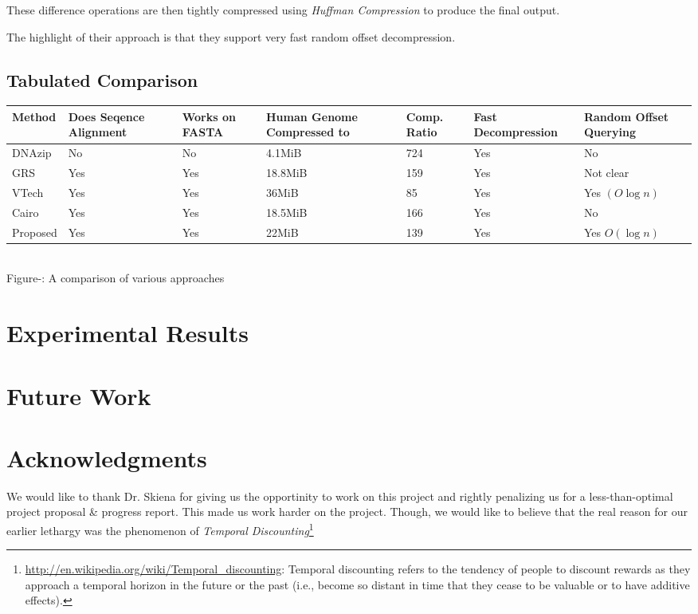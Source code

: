\documentclass[11pt]{article}
\newcounter{fignum}
\begin{document}
These difference operations are then tightly compressed using
\textit{Huffman Compression} to produce the final output.

The highlight of their approach is that they support very fast random
offset decompression.

\subsection{Tabulated Comparison}

\begin{center}
  \begin{tabular}{|p{0.6in}|p{0.7in}|p{0.5in}|p{0.8in}|p{0.5in}|p{0.9in}|p{0.9in}|}
    \hline
    Method & Does Seqence Alignment & Works on FASTA & Human Genome
    Compressed to & Comp. Ratio & Fast Decompression & Random
    Offset Querying\\
    \hline
    DNAzip & No & No & 4.1MiB & 724 & Yes & No\\
    \hline
    GRS & Yes & Yes & 18.8MiB & 159 & Yes & Not clear\\
    \hline
    VTech & Yes & Yes & 36MiB & 85 & Yes & Yes $(O\log{n})$\\
    \hline
    Cairo & Yes & Yes & 18.5MiB & 166 & Yes & No\\
    \hline
    Proposed & Yes & Yes & 22MiB & 139 & Yes & Yes $O(\log{n})$\\
    \hline
  \end{tabular}\\
  \vspace{0.3cm}
  \footnotesize{Figure-: A comparison of various
    approaches}
  \addtocounter{fignum}{1}
\end{center}


\section{Experimental Results}

\section{Future Work}

\section{Acknowledgments}

We would like to thank Dr. Skiena for giving us the opportinity to
work on this project and rightly penalizing us for a less-than-optimal
project proposal \& progress report. This made us work harder on the
project. Though, we would like to believe that the real reason for our
earlier lethargy was the phenomenon of \textit{Temporal
  Discounting}\footnote{\url{http://en.wikipedia.org/wiki/Temporal_discounting}:
  Temporal discounting refers to the tendency of people to discount
  rewards as they approach a temporal horizon in the future or the
  past (i.e., become so distant in time that they cease to be valuable
  or to have additive effects).}
\end{document}
